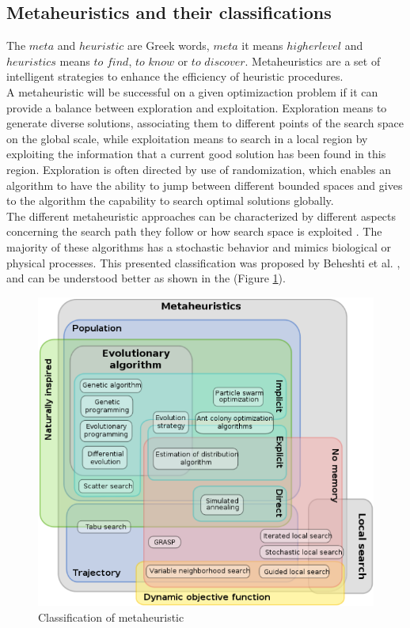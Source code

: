 \subsection{Metaheuristics and their classifications }
The $meta$ and $heuristic$ are Greek words, $meta$ it means $higher level$ and $heuristics$ means $to$ $find$, $to$ $know$ or $to$ $discover$. Metaheuristics are a set of intelligent strategies to enhance the efficiency of heuristic procedures.\\
A metaheuristic will be successful on a given optimizaction problem if it can provide a balance between exploration and exploitation. Exploration means to generate diverse solutions, associating them to different points of the search space on the global scale, while exploitation means to search in a local region by exploiting the information that a current good solution has been found in this region.
Exploration is often directed by use of randomization, which enables an algorithm to have the ability to jump between different bounded spaces and gives to the algorithm the capability to search optimal solutions globally.\\

The different metaheuristic approaches can be characterized by different aspects concerning the search path they follow or how search space is exploited \cite{citeulike:1859945}. The majority of these algorithms has a stochastic behavior and mimics biological or  physical processes. This presented classification was proposed by Beheshti et al. \cite{Beheshti:2014:CCA:2563733.2564085}, and can be understood better as shown in the (Figure \ref{fig:classification-of-mh}).

\squeezeup
\begin{figure}[ht] %
	\centering
  \includegraphics[scale=0.5]{MarcoTeorico/imagenes/classification_mh.png}
	\caption{Classification of metaheuristic}\label{fig:classification-of-mh}
\end{figure}
\squeezeup


